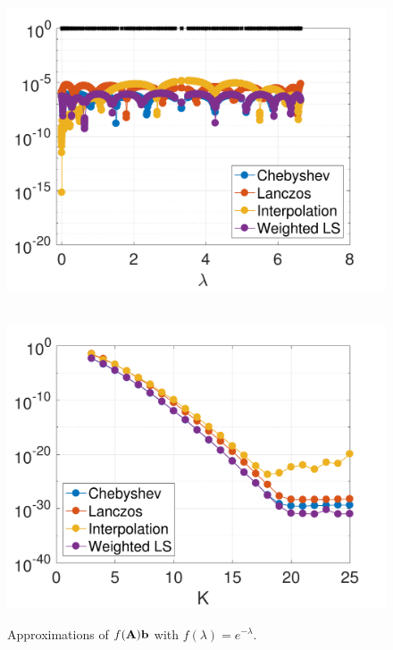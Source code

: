 \documentclass{article}
\begin{document}
\begin{figure}[bth]
\begin{minipage}[m]{0.44\linewidth}
\centerline{~~\includegraphics[width=.95\linewidth]{fig_saylr4sc_deg10}}
\end{minipage}
\begin{minipage}[m]{0.44\linewidth}
\centerline{~~\includegraphics[width=.95\linewidth]{fig_saylr4sc_err_const_b}}
\end{minipage}
\caption{Approximations of $f({\bf A}){\bf b}$ with $f(\lambda)=e^{-\lambda}$.}\label{Fig:numerical}
\end{figure}
\end{document}
